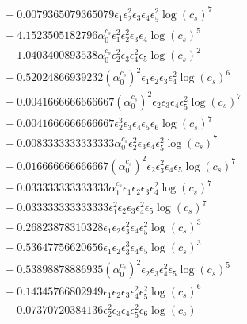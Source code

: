 \documentclass[10pt]{article}
\begin{document}
\begin{align*}
&{}  - 0.0079365079365079 \epsilon_{1} \epsilon_{2}^{2} \epsilon_{3} \epsilon_{4} \epsilon_{5}^{2} \log{\left(c_{s} \right)}^{7} \\
&{}  - 4.1523505182796 \alpha_{0}^{c_s} \epsilon_{1}^{2} \epsilon_{2}^{2} \epsilon_{3} \epsilon_{4} \log{\left(c_{s} \right)}^{5} \\
&{}  - 1.0403400893538 \alpha_{0}^{c_s} \epsilon_{2}^{2} \epsilon_{3} \epsilon_{4}^{2} \epsilon_{5} \log{\left(c_{s} \right)}^{2} \\
&{}  - 0.52024866939232 \left(\alpha_{0}^{c_s}\right)^{2} \epsilon_{1} \epsilon_{2} \epsilon_{3} \epsilon_{4}^{2} \log{\left(c_{s} \right)}^{6} \\
&{}  - 0.0041666666666667 \left(\alpha_{0}^{c_s}\right)^{2} \epsilon_{2} \epsilon_{3} \epsilon_{4} \epsilon_{5}^{2} \log{\left(c_{s} \right)}^{7} \\
&{}  - 0.0041666666666667 \epsilon_{2}^{3} \epsilon_{3} \epsilon_{4} \epsilon_{5} \epsilon_{6} \log{\left(c_{s} \right)}^{7} \\
&{}  - 0.0083333333333333 \alpha_{0}^{c_s} \epsilon_{2}^{2} \epsilon_{3} \epsilon_{4} \epsilon_{5}^{2} \log{\left(c_{s} \right)}^{7} \\
&{}  - 0.016666666666667 \left(\alpha_{0}^{c_s}\right)^{2} \epsilon_{2} \epsilon_{3}^{2} \epsilon_{4} \epsilon_{5} \log{\left(c_{s} \right)}^{7} \\
&{}  - 0.033333333333333 \alpha_{1}^{c_s} \epsilon_{1} \epsilon_{2} \epsilon_{3} \epsilon_{4}^{2} \log{\left(c_{s} \right)}^{7} \\
&{}  - 0.033333333333333 \epsilon_{1}^{2} \epsilon_{2} \epsilon_{3} \epsilon_{4}^{2} \epsilon_{5} \log{\left(c_{s} \right)}^{7} \\
&{}  - 0.26823878310328 \epsilon_{1} \epsilon_{2} \epsilon_{3}^{2} \epsilon_{4} \epsilon_{5}^{2} \log{\left(c_{s} \right)}^{3} \\
&{}  - 0.53647756620656 \epsilon_{1} \epsilon_{2} \epsilon_{3}^{3} \epsilon_{4} \epsilon_{5} \log{\left(c_{s} \right)}^{3} \\
&{}  - 0.53898878886935 \left(\alpha_{0}^{c_s}\right)^{2} \epsilon_{2} \epsilon_{3} \epsilon_{4}^{2} \epsilon_{5} \log{\left(c_{s} \right)}^{5} \\
&{}  - 0.14345766802949 \epsilon_{1} \epsilon_{2} \epsilon_{3} \epsilon_{4}^{2} \epsilon_{5}^{2} \log{\left(c_{s} \right)}^{6} \\
&{}  - 0.07370720384136 \epsilon_{2}^{2} \epsilon_{3} \epsilon_{4} \epsilon_{5}^{2} \epsilon_{6} \log{\left(c_{s} \right)} \\

\end{align*}
\end{document}
